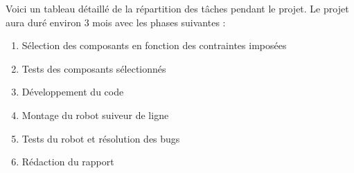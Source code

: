 Voici un tableau détaillé de la répartition des tâches pendant le projet.
Le projet aura duré environ 3 mois avec les phases suivantes :
\begin{enumerate}
    \item Sélection des composants en fonction des contraintes imposées
    \item Tests des composants sélectionnés
    \item Développement du code
    \item Montage du robot suiveur de ligne
    \item Tests du robot et résolution des bugs
    \item Rédaction du rapport
\end{enumerate}
